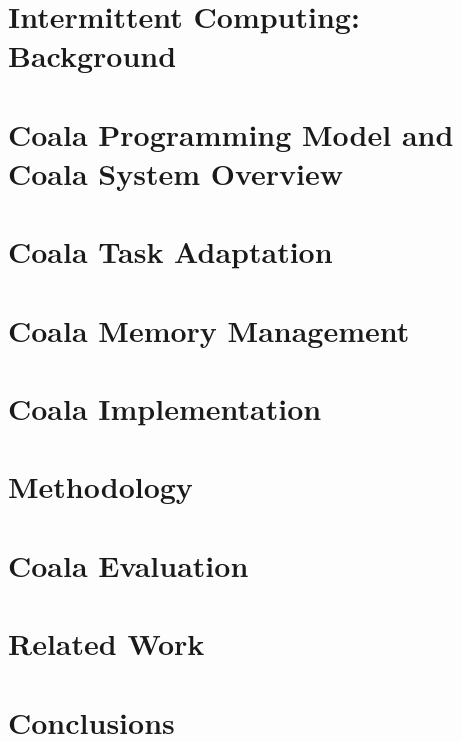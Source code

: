\documentclass[acmsmall,review,anonymous]{acmart}\settopmatter{printfolios=true,printccs=false,printacmref=false}
\newcommand{\sys}{Coala\xspace}
\begin{document}


\section{Intermittent Computing: Background}
\label{sec:background}




\section{\sys Programming Model and \sys System Overview}
\label{sec:systemdescription}



\section{\sys Task Adaptation}
\label{sec:task_adaptation}





\section{\sys Memory Management}
\label{sec:memory_virtulaization}



\section{\sys Implementation}
\label{sec:implementation}




%

\section{Methodology}
\label{sec:methodology}



\section{\sys Evaluation}
\label{sec:evaluation}



\section{Related Work}
\label{sec:related_work}



\section{Conclusions}
\label{sec:conclusions}




\end{document}
